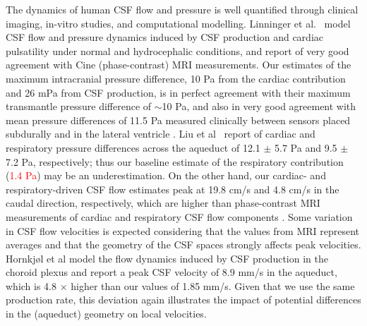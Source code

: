 \documentclass[fleqn,10pt]{wlscirep}
\newcommand{\fixme}[1]{\textcolor{red}{#1}}
\begin{document}
The dynamics of human CSF flow and pressure is well quantified
through clinical imaging, in-vitro studies, and computational
modelling\cite{linninger2007cerebrospinal, sweetman2011cerebrospinal,
  vinje2019respiratory, hornkjol2022csf, causemann2022human,
  karki2025real, liu2025transmantle}. Linninger et
al.~\cite{linninger2007cerebrospinal} model CSF flow and pressure
dynamics induced by CSF production and cardiac pulsatility under
normal and hydrocephalic conditions, and report of very good agreement
with Cine (phase-contrast) MRI measurements. Our estimates of the
maximum intracranial pressure difference, 10 Pa from the cardiac
contribution and 26 mPa from CSF production, is in perfect agreement
with their maximum transmantle pressure difference of $\sim$10 Pa, and
also in very good agreement with mean pressure differences of 11.5 Pa
measured clinically between sensors placed subdurally and in the
lateral ventricle \cite{vinje2019respiratory}. Liu et
al~\cite{liu2025transmantle} report of cardiac and respiratory
pressure differences across the aqueduct of 12.1 $\pm$ 5.7 Pa and 9.5
$\pm$ 7.2 Pa, respectively; thus our baseline estimate of the
respiratory contribution (\fixme{1.4 Pa}) may be an
underestimation. On the other hand, our cardiac- and
respiratory-driven CSF flow estimates peak at 19.8 cm/s and 4.8 cm/s
in the caudal direction, respectively, which are higher than
phase-contrast MRI measurements of cardiac and respiratory CSF flow
components \cite{takizawa2017characterization,
  yildiz2017quantifying}. Some variation in CSF flow velocities is
expected considering that the values from MRI represent averages
\cite{yildiz2017quantifying} and that the geometry of the CSF spaces
strongly affects peak velocities\cite{vinje2019respiratory,
  causemann2022human}. Hornkjøl et al \cite{hornkjol2022csf} model the
flow dynamics induced by CSF production in the choroid plexus and
report a peak CSF velocity of 8.9 mm/s in the aqueduct, which is 4.8
$\times$ higher than our values of 1.85 mm/s. Given that we use the
same production rate, this deviation again illustrates the impact of
potential differences in the (aqueduct) geometry on local velocities.

\end{document}
